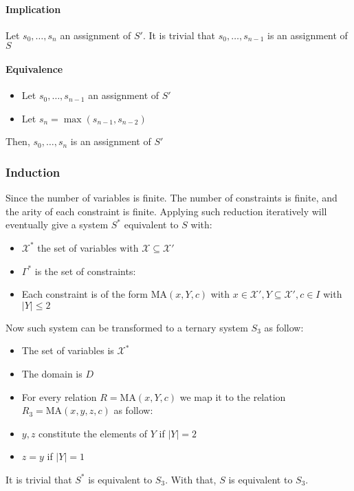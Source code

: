 \paragraph{Implication}
Let $s_0,\dots,s_{n}$ an assignment of $S'.$ It is trivial that $s_0,\dots,s_{n-1}$ is an assignment of $S$ 

\paragraph{Equivalence}
\begin{itemize}
	\item Let $s_0,\dots,s_{n-1}$ an assignment of $S'$
	\item Let $s_n=\max(s_{n-1},s_{n-2})$
\end{itemize}
Then, $s_0,\dots,s_n$ is an assignment of $S'$

\subsubsection{Induction}
Since the number of variables is finite. The number of constraints is finite, and the arity of each constraint is finite. Applying such reduction iteratively will eventually give a system $S^*$ equivalent to $S$ with:
\begin{itemize}
	\item $\mathcal{X}^*$ the set of variables with $\mathcal{X}\subseteq \mathcal{X}'$ 
	\item $\Gamma^*$ is the set of constraints:
	\item Each constraint is of the form $\text{MA}(x,Y,c)$ with $x\in \mathcal{X}',Y\subseteq \mathcal{X}',c\in I$ with $\lvert Y\rvert \le 2$   
\end{itemize}
Now such system can be transformed to a ternary system $S_3$ as follow:
\begin{itemize}
	\item The set of variables is $\mathcal{X}^*$
	\item The domain is $D$
	\item For every relation $R=\text{MA}(x,Y,c)$ we map it to the relation $R_3=\text{MA}(x,y,z,c)$ as follow:
	\item $y,z$ constitute the elements of $Y$ if $\lvert  Y \rvert=2$
	\item $z=y$ if $\lvert Y \rvert=1$
\end{itemize}


It is trivial that $S^*$ is equivalent to $S_3.$
With that, $S$ is equivalent to $S_3.$



